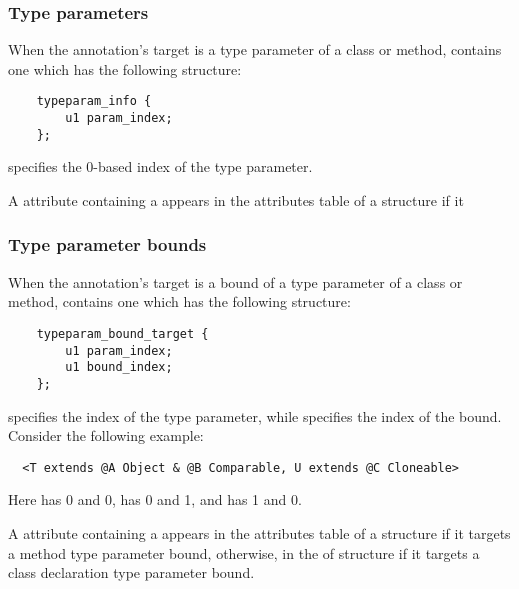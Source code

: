 \documentclass[10pt]{article}
\begin{document}
\subsubsection{Type parameters\label{class-file:ext:ri:mtp}}

When the annotation's target is a type parameter of a class or method,
 contains one  which has the
following structure:

\begin{Verbatim}
    typeparam_info {
        u1 param_index;
    };
\end{Verbatim}

 specifies the 0-based index of the type parameter.

A \RuntimeInOrVisibleTypeAnnotations attribute containing a
 appears in the attributes table of a
 structure if it 

\subsubsection{Type parameter bounds\label{class-file:ext:ri:tpbound}}

When the annotation's target is a bound of a type parameter of a class or
method,  contains one 
which has the following structure:

\begin{Verbatim}
    typeparam_bound_target {
        u1 param_index;
        u1 bound_index;
    };
\end{Verbatim}

 specifies the index of the type parameter, while
 specifies the index of the bound.  Consider the following
example:

\begin{Verbatim}
  <T extends @A Object & @B Comparable, U extends @C Cloneable>
\end{Verbatim}

\noindent
Here
 has  0 and  0,
 has  0 and  1, and
 has  1 and  0.

A \RuntimeInOrVisibleTypeAnnotations attribute containing a
 appears in the attributes table of a
 structure if it targets a method type parameter bound,
otherwise, in the  of  structure if it
targets a class declaration type parameter bound.
\end{document}
